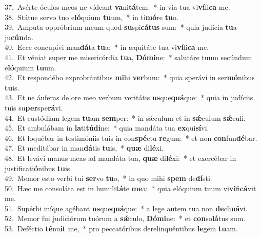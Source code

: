 {37.~}Avérte óculos meos ne vídeant \textbf{va}ni\textbf{tá}tem:~* in via tua vi\textbf{ví}fi\textbf{ca} me.\\
{38.~}Státue servo tuo e\textbf{ló}quium \textbf{tu}um,~* in ti\textbf{mó}re \textbf{tu}o.\\
{39.~}Amputa oppróbrium meum quod \textbf{su}spi\textbf{cá}\textbf{tus} sum:~* quia judícia \textbf{tu}a ju\textbf{cún}da.\\
{40.~}Ecce concupívi man\textbf{dá}ta \textbf{tu}a:~* in æquitáte tua vi\textbf{ví}fi\textbf{ca} me.\\
{41.~}Et véniat super me misericórdia \textbf{tu}a, \textbf{Dó}\textbf{mi}ne:~* salutáre tuum secúndum e\textbf{ló}quium \textbf{tu}um.\\
{42.~}Et respondébo exprobrántibus \textbf{mi}hi \textbf{ver}bum:~* quia sperávi in ser\textbf{mó}nibus \textbf{tu}is.\\
{43.~}Et ne áuferas de ore meo verbum veritátis \textbf{us}que\textbf{quá}que:~* quia in judíciis tuis su\textbf{per}spe\textbf{rá}vi.\\
{44.~}Et custódiam legem \textbf{tu}am \textbf{sem}per:~* in sǽculum et in \textbf{sǽ}culum \textbf{sǽ}culi.\\
{45.~}Et ambulábam in \textbf{la}ti\textbf{tú}\textbf{di}ne:~* quia mandáta tua \textbf{ex}qui\textbf{sí}vi.\\
{46.~}Et loquébar in testimóniis tuis in con\textbf{spé}ctu \textbf{re}gum:~* et non \textbf{con}fun\textbf{dé}bar.\\
{47.~}Et meditábar in man\textbf{dá}tis \textbf{tu}is,~* \textbf{quæ} di\textbf{lé}xi.\\
{48.~}Et levávi manus meas ad mandáta tua, \textbf{quæ} di\textbf{lé}xi:~* et exercébar in justificati\textbf{ó}nibus \textbf{tu}is.\\
{49.~}Memor esto verbi tui \textbf{ser}vo \textbf{tu}o,~* in quo mihi \textbf{spem} de\textbf{dí}sti.\\
{50.~}Hæc me consoláta est in humili\textbf{tá}te \textbf{me}a:~* quia elóquium tuum vi\textbf{vi}fi\textbf{cá}vit me.\\
{51.~}Supérbi iníque agébant \textbf{us}que\textbf{quá}que:~* a lege autem tua non \textbf{de}cli\textbf{ná}vi.\\
{52.~}Memor fui judiciórum tuórum a \textbf{sǽ}culo, \textbf{Dó}\textbf{mi}ne:~* et \textbf{con}so\textbf{lá}tus sum.\\
{53.~}Deféctio \textbf{té}nu\textbf{it} me,~* pro peccatóribus derelinquéntibus \textbf{le}gem \textbf{tu}am.\\
